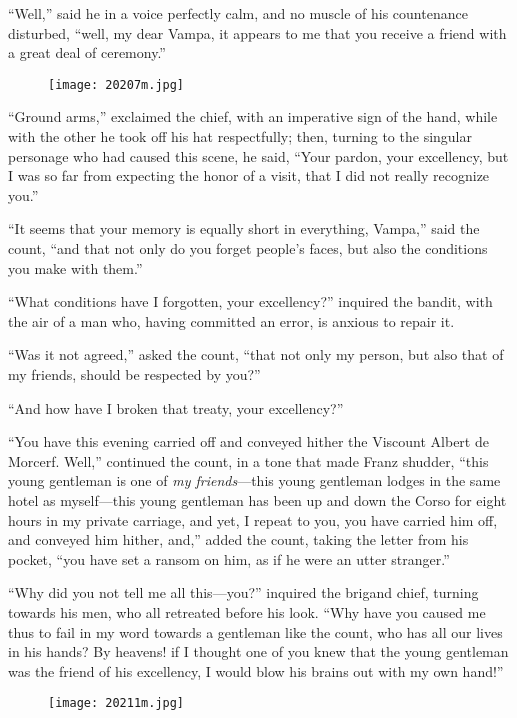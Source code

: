 “Well,” said he in a voice perfectly calm, and no muscle of his
countenance disturbed, “well, my dear Vampa, it appears to me that you
receive a friend with a great deal of ceremony.”

\begin{figure}[h]
\texttt{[image: 20207m.jpg]}
\end{figure}

“Ground arms,” exclaimed the chief, with an imperative sign of the
hand, while with the other he took off his hat respectfully; then,
turning to the singular personage who had caused this scene, he said,
“Your pardon, your excellency, but I was so far from expecting the
honor of a visit, that I did not really recognize you.”

“It seems that your memory is equally short in everything, Vampa,” said
the count, “and that not only do you forget people’s faces, but also
the conditions you make with them.”

“What conditions have I forgotten, your excellency?” inquired the
bandit, with the air of a man who, having committed an error, is
anxious to repair it.

“Was it not agreed,” asked the count, “that not only my person, but
also that of my friends, should be respected by you?”

“And how have I broken that treaty, your excellency?”

“You have this evening carried off and conveyed hither the Viscount
Albert de Morcerf. Well,” continued the count, in a tone that made
Franz shudder, “this young gentleman is one of \textit{my friends}—this young
gentleman lodges in the same hotel as myself—this young gentleman has
been up and down the Corso for eight hours in my private carriage, and
yet, I repeat to you, you have carried him off, and conveyed him
hither, and,” added the count, taking the letter from his pocket, “you
have set a ransom on him, as if he were an utter stranger.”

“Why did you not tell me all this—you?” inquired the brigand chief,
turning towards his men, who all retreated before his look. “Why have
you caused me thus to fail in my word towards a gentleman like the
count, who has all our lives in his hands? By heavens! if I thought one
of you knew that the young gentleman was the friend of his excellency,
I would blow his brains out with my own hand!”

\begin{figure}[ht]
\texttt{[image: 20211m.jpg]}
\end{figure}

